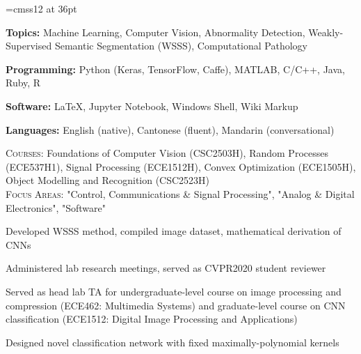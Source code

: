 \documentclass[12pt]{cv_style}
\begin{document}
\font\titlefont=cmss12 at 36pt


\begin{ditem}
	\item \textbf{Topics:} Machine Learning, Computer Vision, Abnormality Detection, Weakly-Supervised Semantic Segmentation (WSSS), Computational Pathology
	\item \textbf{Programming:} Python (Keras, TensorFlow, Caffe), MATLAB, C/C++, Java, Ruby, R
	\item \textbf{Software:} \LaTeX, Jupyter Notebook, Windows Shell, Wiki Markup
	\item \textbf{Languages:} English (native), Cantonese (fluent), Mandarin (conversational)
\end{ditem}

\flushleft{}
\medspace
\textsc{Courses:} Foundations of Computer Vision (CSC2503H), Random Processes (ECE537H1), Signal Processing (ECE1512H), Convex Optimization (ECE1505H), Object Modelling and Recognition (CSC2523H)\\
\medspace
{}
\medspace
\textsc{Focus Areas:} "Control, Communications \& Signal Processing", "Analog \& Digital Electronics", "Software"
\medspace

\begin{ditem}
	\item Developed WSSS method, compiled image dataset, mathematical derivation of CNNs\\
	\item Administered lab research meetings, served as CVPR2020 student reviewer\\
	\item Served as head lab TA for undergraduate-level course on image processing and compression (ECE462: Multimedia Systems) and graduate-level course on CNN classification (ECE1512: Digital Image Processing and Applications)\\
\end{ditem}
%
\medspace
Designed novel classification network with fixed maximally-polynomial kernels\\
\medspace
%
\end{document}
